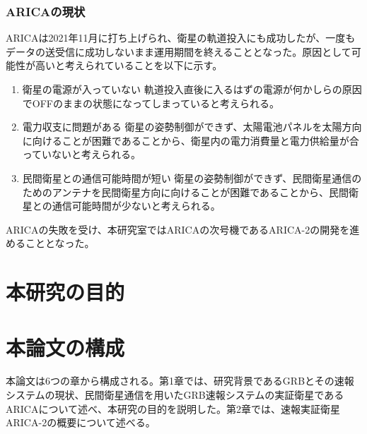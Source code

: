 \subsubsection{ARICAの現状}
ARICAは2021年11月に打ち上げられ、衛星の軌道投入にも成功したが、一度もデータの送受信に成功しないまま運用期間を終えることとなった。原因として可能性が高いと考えられていることを以下に示す。

\begin{enumerate}
\item 衛星の電源が入っていない
軌道投入直後に入るはずの電源が何かしらの原因でOFFのままの状態になってしまっていると考えられる。
\item 電力収支に問題がある
衛星の姿勢制御ができず、太陽電池パネルを太陽方向に向けることが困難であることから、衛星内の電力消費量と電力供給量が合っていないと考えられる。
\item 民間衛星との通信可能時間が短い
衛星の姿勢制御ができず、民間衛星通信のためのアンテナを民間衛星方向に向けることが困難であることから、民間衛星との通信可能時間が少ないと考えられる。
\end{enumerate}

ARICAの失敗を受け、本研究室ではARICAの次号機であるARICA-2の開発を進めることとなった。


\section{本研究の目的}


\section{本論文の構成}
本論文は6つの章から構成される。第1章では、研究背景であるGRBとその速報システムの現状、民間衛星通信を用いたGRB速報システムの実証衛星であるARICAについて述べ、本研究の目的を説明した。第2章では、速報実証衛星ARICA-2の概要について述べる。